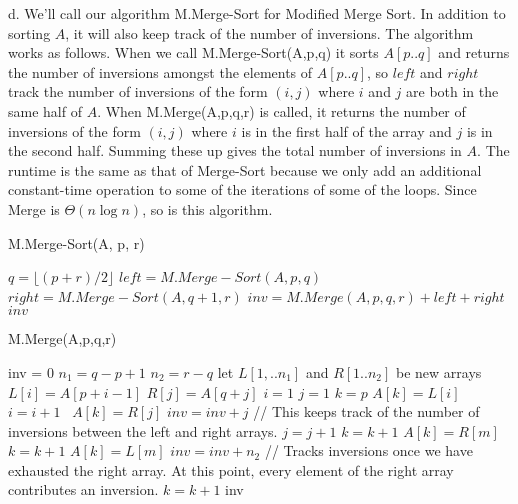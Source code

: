 \documentclass{article}
\begin{document}
d. We'll call our algorithm M.Merge-Sort for Modified Merge Sort.  In addition to sorting $A$, it will also keep track of the number of inversions.  The algorithm works as follows.  When we call M.Merge-Sort(A,p,q) it sorts $A[p..q]$ and returns the number of inversions amongst the elements of $A[p..q]$, so $left$ and $right$ track the number of inversions of the form $(i,j)$ where $i$ and $j$ are both in the same half of $A$.  When M.Merge(A,p,q,r) is called, it returns the number of inversions of the form $(i,j)$ where $i$ is in the first half of the array and $j$ is in the second half.  Summing these up gives the total number of inversions in $A$.  The runtime is the same as that of Merge-Sort because we only add an additional constant-time operation to some of the iterations of some of the loops.  Since Merge is $\Theta(n \log n)$, so is this algorithm.

\begin{algorithm}
\caption{M.Merge-Sort(A, p, r)}
\begin{algorithmic}
	\State $q = \lfloor(p+r)/2\rfloor$
	\State $left = M.Merge-Sort(A,p,q)$
	\State $right = M.Merge-Sort(A,q+1,r)$
	\State $inv = M.Merge(A,p,q,r) + left + right$
	\State \Return $inv$
\EndIf
\State {}
\end{algorithmic}
\end{algorithm}

\begin{algorithm}
\caption{M.Merge(A,p,q,r)}
\begin{algorithmic}
\State inv = 0
\State $n_1 = q-p+1$
\State $n_2 = r-q$
\State let $L[1,..n_1]$ and $R[1..n_2]$ be new arrays
	\State $L[i] = A[p+i-1]$
\EndFor
{}
	\State $R[j] = A[q+j]$
\EndFor
\State $i=1$
\State $j=1$
\State $k=p$
		\State $A[k] = L[i]$
		\State $i = i+1$
	\Else  $\,\,\,A[k] = R[j]$
		\State $inv = inv + j$ // This keeps track of the number of inversions between the left and right arrays.
		\State $j = j+1$
	\EndIf
\State $k = k + 1$
\EndWhile
{}
		\State $A[k] = R[m]$
		\State $k = k + 1$	
	\EndFor
\EndIf
{}
		\State $A[k] = L[m]$
		\State $inv = inv + n_2$ // Tracks inversions once we have exhausted the right array.  At this point, every element of the right array contributes an inversion.
		\State $k = k + 1$
	\EndFor
\EndIf
\State \Return inv
\end{algorithmic}
\end{algorithm}
\end{document}
